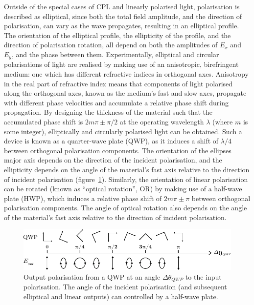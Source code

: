 Outside of the special cases of CPL and linearly polarised light, polarisation is described as elliptical, since both the total field amplitude, and the direction of polarisation, can vary as the wave propagates, resulting in an elliptical profile. The orientation of the elliptical profile, the ellipticity of the profile, and the direction of polarisation rotation, all depend on both the amplitudes of $E_x$ and $E_y$, and the phase between them.
Experimentally, elliptical and circular polarisations of light are realised by making use of an anisotropic, birefringent medium: one which has different refractive indices in orthogonal axes. Anisotropy in the real part of refractive index means that components of light polarised along the orthogonal axes, known as the medium's fast and slow axes, propagate with different phase velocities and accumulate a relative phase shift during propagation. By designing the thickness of the material such that the accumulated phase shift is $2m\pi \pm \pi/2$ at the operating wavelength $\lambda$ (where $m$ is some integer), elliptically and circularly polarised light can be obtained. Such a device is known as a quarter-wave plate (QWP), as it induces a shift of $\lambda/4$ between orthogonal polarisation components. The orientation of the ellipses major axis depends on the direction of the incident polarisation, and the ellipticity depends on the angle of the material's fast axis relative to the direction of incident polarisation (figure~\ref{fig:background:Chirality:QWP}). Similarly, the orientation of linear polarisation can be rotated (known as ``optical rotation'', OR) by making use of a half-wave plate (HWP), which induces a relative phase shift of $2m\pi \pm \pi$ between orthogonal polarisation components. The angle of optical rotation also depends on the angle of the material's fast axis relative to the direction of incident polarisation.
\begin{figure}[htb!]
    \centering
    \includegraphics[scale=1.0]{./figures/background/chiroptics/QWP_in_out.pdf}
    \caption{\label{fig:background:Chirality:QWP}Output polarisation from a QWP at an angle $\Delta\theta_{QWP}$ to the input polarisation. The angle of the incident polarisation (and subsequent elliptical and linear outputs) can controlled by a half-wave plate.}
\end{figure}


